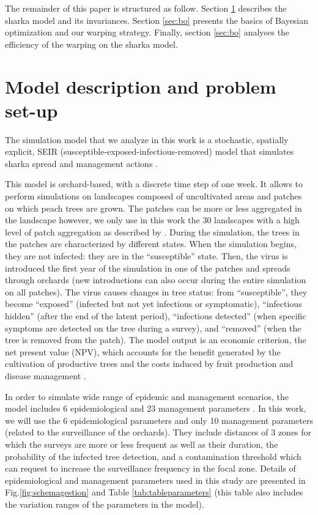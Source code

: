 The remainder of this paper is structured as follow. Section \ref{sec:model} describes the sharka model and its invariances.
Section \ref{sec:bo} presents the basics of Bayesian optimization and our warping strategy. Finally, section \ref{sec:bo}
analyses the efficiency of the warping on the sharka model.

\section{Model description and problem set-up}\label{sec:model}

The simulation model that we analyze in this work is a stochastic, spatially explicit, SEIR (susceptible-exposed-infectious-removed) model that simulates sharka spread and management actions 
\citep[including surveillance, removals and replantations][]{pleydell2018estimation,rimbaud2018using,rimbaud2018heuristic}.

This model is orchard-based, with a discrete time step of one week. It allows to perform simulations on landscapes composed of uncultivated areas and patches on which peach trees are grown. 
The patches can be more or less aggregated in the landscape however, we only use in this work the 30 landscapes with a high level of patch aggregation as described by \citet{picard2018}. 
During the simulation, the trees in the patches are characterized by different states. When the simulation begins, they are not infected: they are in the ``susceptible'' state. 
Then, the virus is introduced the first year of the simulation in one of the patches and spreads through orchards (new introductions can also occur during the entire simulation on all patches).
 The virus causes changes in tree status: from ``susceptible'', they become ``exposed'' (infected but not yet infectious or symptomatic), ``infectious hidden'' (after the end of the latent period), 
 ``infectious detected'' (when specific symptoms are detected on the tree during a survey), and ``removed'' (when the tree is removed from the patch). 
The model output is an economic criterion, the net present value (NPV), which accounts for the benefit generated by the cultivation of productive trees 
and the costs induced by fruit production and disease management \cite{rimbaud2018heuristic}.

In order to simulate wide range of epidemic and management scenarios, the model includes 6 epidemiological and 23 management parameters \cite{rimbaud2018heuristic,picard2018}. 
In this work, we will use the 6 epidemiological parameters and only 10 management parameters (related to the surveillance of the orchards). 
They include distances of 3 zones for which the surveys are more or less frequent as well as their duration, the probability of the infected tree detection, 
and a contamination threshold which can request to increase the surveillance frequency in the focal zone. 
Details of epidemiological and management parameters used in this study are presented in Fig.\ref{fig:schemagestion} and Table \ref{tab:tableparameters} 
(this table also includes the variation ranges of the parameters in the model).

